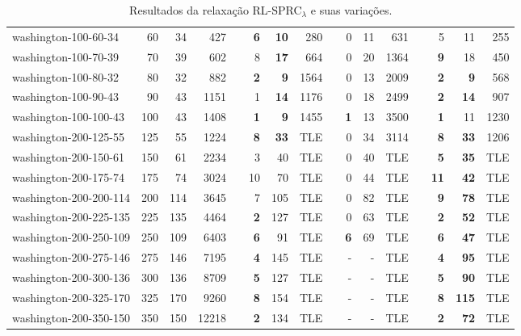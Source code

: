 \begin{table}[!ht]
{\begin{tabular}{lrrrrrrrrrrrlrrr}
washington-100-60-34 & 60 & 34 & 427 &  & \textbf{6} & \textbf{10} & 280 &  & 0 & 11 & 631 &  & 5 & 11 & 255 \\
washington-100-70-39 & 70 & 39 & 602 &  & 8 & \textbf{17} & 664 &  & 0 & 20 & 1364 &  & \textbf{9} & 18 & 450 \\
washington-100-80-32 & 80 & 32 & 882 &  & \textbf{2} & \textbf{9} & 1564 &  & 0 & 13 & 2009 &  & \textbf{2} & \textbf{9} & 568 \\
washington-100-90-43 & 90 & 43 & 1151 &  & 1 & \textbf{14} & 1176 &  & 0 & 18 & 2499 &  & \textbf{2} & \textbf{14} & 907 \\
washington-100-100-43 & 100 & 43 & 1408 &  & \textbf{1} & \textbf{9} & 1455 &  & \textbf{1} & 13 & 3500 &  & \textbf{1} & 11 & 1230 \\ \hline
washington-200-125-55 & 125 & 55 & 1224 &  & \textbf{8} & \textbf{33} & TLE &  & 0 & 34 & 3114 &  & \textbf{8} & \textbf{33} & 1206 \\
washington-200-150-61 & 150 & 61 & 2234 &  & 3 & 40 & TLE &  & 0 & 40 & TLE &  & \textbf{5} & \textbf{35} & TLE \\
washington-200-175-74 & 175 & 74 & 3024 &  & 10 & 70 & TLE &  & 0 & 44 & TLE &  & \textbf{11} & \textbf{42} & TLE \\
washington-200-200-114 & 200 & 114 & 3645 &  & 7 & 105 & TLE &  & 0 & 82 & TLE &  & \textbf{9} & \textbf{78} & TLE \\
washington-200-225-135 & 225 & 135 & 4464 &  & \textbf{2} & 127 & TLE &  & 0 & 63 & TLE &  & \textbf{2} & \textbf{52} & TLE \\
washington-200-250-109 & 250 & 109 & 6403 &  & \textbf{6} & 91 & TLE &  & \textbf{6} & 69 & TLE &  & \textbf{6} & \textbf{47} & TLE \\
washington-200-275-146 & 275 & 146 & 7195 &  & \textbf{4} & 145 & TLE &  & - & - & TLE &  & \textbf{4} & \textbf{95} & TLE \\
washington-200-300-136 & 300 & 136 & 8709 &  & \textbf{5} & 127 & TLE &  & - & - & TLE &  & \textbf{5} & \textbf{90} & TLE \\
washington-200-325-170 & 325 & 170 & 9260 &  & \textbf{8} & 154 & TLE &  & - & - & TLE &  & \textbf{8} & \textbf{115} & TLE \\
washington-200-350-150 & 350 & 150 & 12218 &  & \textbf{2} & 134 & TLE &  & - & - & TLE &  & \textbf{2} & \textbf{72} & TLE \\ \hline
\end{tabular}%
}
\caption{Resultados da relaxação RL-SPRC$_{\lambda}$ e suas variações.}
\label{tab:rl-sprc-lambda}
\end{table}

